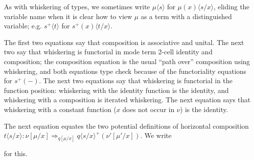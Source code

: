 \documentclass[10pt]{article}
\theoremstyle{definition}
\newcommand{\tcell}{\Rightarrow}
\newcommand{\id}{\mathsf{id}}
\newcommand\TermTwoT[5]{\ensuremath{#1 \vdash {#2} : #3 \tcell_{#5} #4}}
\newcommand\TrPlus[2]{\ensuremath{{#1}^+(#2)}}
\newcommand\ap[2]{\ensuremath{#1 \langle #2 \rangle }}
\newcommand\ApPlus[2]{\ensuremath{{#1}^+ \langle #2 \rangle }}
\begin{document}
As with whiskering of types,
we sometimes write \ap{\mu}{s} for \ap{\mu(x)}{s/x}, eliding the
variable name when it is clear how to view $\mu$ as a term with a
distinguished variable; e.g. $\ApPlus{s}{t}$ for
$\ap{\TrPlus{s}{x}}{t/x}$.

The first two equations say that composition is associative and unital.
The next two say that whiskering is functorial in mode term 2-cell identity
and composition; the composition equation is the usual ``path over''
composition using whiskering, and both equations type check because of
the functoriality equations for $\TrPlus{s}{-}$.  The next two equations
say that whiskering is functorial in the function position: whiskering
with the identity function is the identity, and whiskering with a
composition is iterated whiskering.  The next equation says that
whiskering with a constant function ($x$ does not occur in $\nu$) is the
identity.

The next equation equates the two potential definitions of horizontal
composition $\ap t {s/x} : \nu[\mu/x] \tcell_{q[\mu/x]}
\TrPlus{\ap{q}{s/x}}{\nu'[\mu'/x]}$.  We write
for this.
\end{document}
